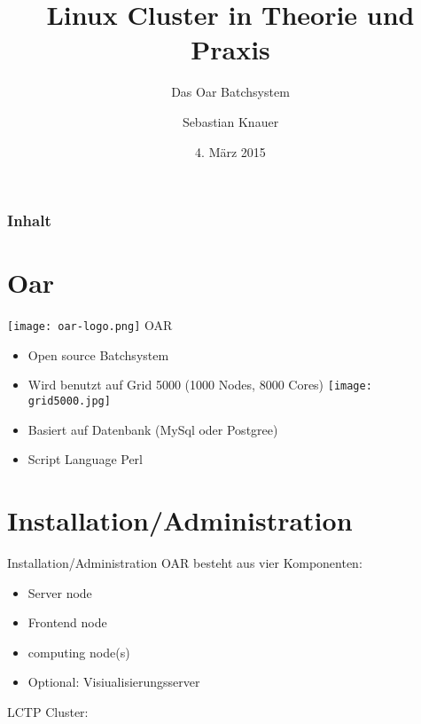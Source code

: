 \documentclass[10pt,utf8]{beamer}
\title{Linux Cluster in Theorie und Praxis}
\subtitle{Das Oar Batchsystem}
\author{Sebastian Knauer}
\date{4. M\"arz 2015}
\institute[ZIH TUD]{Zentrum f\"ur Informationsdienste und Hochleistungsrechnen -- TU Dresden}
\begin{document}
\zihmaketitle

\begin{frame}
\frametitle{Inhalt}
	\tableofcontents
\end{frame}

\section{Oar}
\begin{frame}{\texttt{[image: oar-logo.png]}  OAR}
    \begin{itemize}
        \item{Open source Batchsystem}
        \item{Wird benutzt auf Grid 5000 (1000 Nodes, 8000 Cores)
	        \texttt{[image: grid5000.jpg]}
            }
        \item{Basiert auf Datenbank (MySql oder Postgree) }
        \item{Script Language Perl}
    \end{itemize}
\end{frame}

\section{Installation/Administration}
\begin{frame}{Installation/Administration}
    OAR besteht aus vier Komponenten:
    \begin{itemize}
        \item{Server node}
        \item{Frontend node}
        \item{computing node(s)}
        \item{Optional: Visiualisierungsserver}
    \end{itemize}

    LCTP Cluster:


\end{frame}
\end{document}
